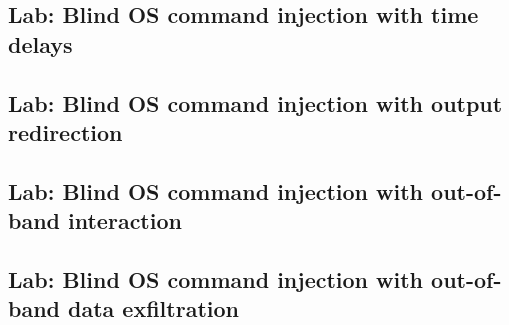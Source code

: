 \documentclass{article}
\begin{document}
\subsection*{Lab: Blind OS command injection with time delays}
\subsection*{Lab: Blind OS command injection with output redirection}
\subsection*{Lab: Blind OS command injection with out-of-band interaction}
\subsection*{Lab: Blind OS command injection with out-of-band data exfiltration}
\end{document}
